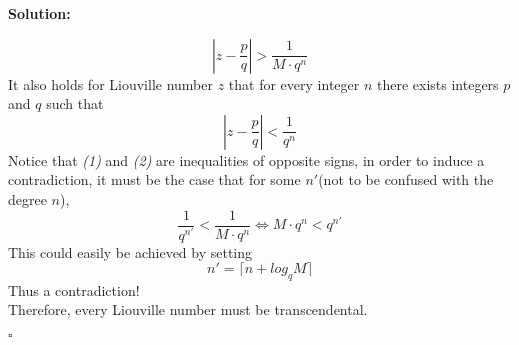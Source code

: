 \documentclass[UTF8, 12pt]{ctexart}
\newenvironment{solution}{\noindent\ignorespaces\textbf{Solution:}}{\hfill $\square$\par\noindent}
\begin{document}
\begin{solution}
\begin{enumerate}[label=\arabic*)]
\begin{equation}
                |z - \frac{p}{q}| > \frac{1}{M\cdot q^n}
                \end{equation}
                It also holds for Liouville number $z$ that for every integer $n$ there exists integers $p$ and $q$ such that
                \begin{equation}
                |z - \frac{p}{q}| < \frac{1}{q^n}
                \end{equation}
                Notice that \textit{(1)} and \textit{(2)} are inequalities of opposite signs, in order to induce a contradiction, it must be the case that
                for some $n'$(not to be confused with the degree $n$),
                $$
                \frac{1}{q^{n'}} < \frac{1}{M\cdot q^n} \Longleftrightarrow M\cdot q^n < q^{n'}
                $$
                This could easily be achieved by setting
                $$
                n' = \lceil n + log_qM\rceil
                $$
                Thus a contradiction! \\ 
                Therefore, every Liouville number must be transcendental.
        \end{enumerate}
    \end{solution}
\end{document}
